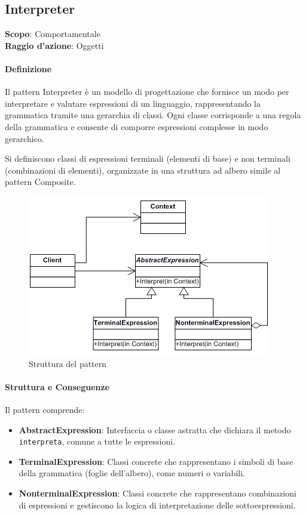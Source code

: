 \subsection{Interpreter}
\label{interpreter}

\textbf{Scopo}: Comportamentale \\
\textbf{Raggio d'azione}: Oggetti

\paragraph{Definizione} Il pattern Interpreter è un modello di progettazione che fornisce un modo per interpretare e valutare espressioni di un linguaggio, rappresentando la grammatica tramite una gerarchia di classi. Ogni classe corrisponde a una regola della grammatica e consente di comporre espressioni complesse in modo gerarchico.

Si definiscono classi di espressioni terminali (elementi di base) e non terminali (combinazioni di elementi), organizzate in una struttura ad albero simile al pattern Composite.

\begin{figure}[H]
    \centering
    \includegraphics[width=1\linewidth]{assets/pattern/interpreter/interpreter-struttura.png}
    \caption{Struttura del pattern}
\end{figure}

\paragraph{Struttura e Conseguenze} Il pattern comprende:
\begin{itemize}
    \item \textbf{AbstractExpression}: Interfaccia o classe astratta che dichiara il metodo \texttt{interpreta}, comune a tutte le espressioni.
    \item \textbf{TerminalExpression}: Classi concrete che rappresentano i simboli di base della grammatica (foglie dell'albero), come numeri o variabili.
    \item \textbf{NonterminalExpression}: Classi concrete che rappresentano combinazioni di espressioni e gestiscono la logica di interpretazione delle sottoespressioni.
\end{itemize}

